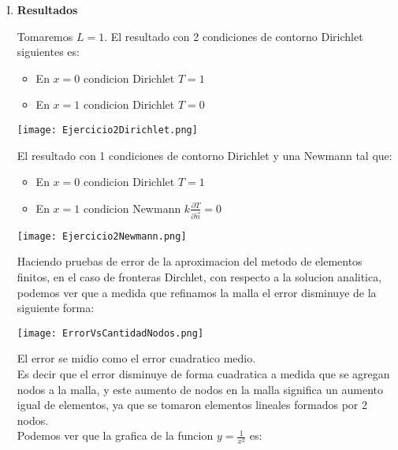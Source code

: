 \documentclass{article}
\begin{document}
\begin{enumerate}[1)]
{\begin{enumerate}[I.]
        Donde $h$ es el ancho de cada elemento.
        Con derivadas:

        \begin{itemize}
            \item $\frac{\partial N_i}{\partial x} = \frac{-1}{h}$
            \item $\frac{\partial N_j}{\partial x} = \frac{1}{h}$
        \end{itemize}

        \item \textbf{Resultados}

        Tomaremos $L=1$. El resultado con 2 condiciones de contorno Dirichlet siguientes es:

        \begin{itemize}
            \item En $x=0$ condicion Dirichlet $T=1$
            \item En $x=1$ condicion Dirichlet $T=0$
        \end{itemize}

        \begin{center}
            \texttt{[image: Ejercicio2Dirichlet.png]}
        \end{center}

        El resultado con 1 condiciones de contorno Dirichlet y una Newmann tal que:

        \begin{itemize}
            \item En $x=0$ condicion Dirichlet $T=1$
            \item En $x=1$ condicion Newmann   $k\frac{\partial T}{\partial \vec{n}}=0$
        \end{itemize}

        \begin{center}
            \texttt{[image: Ejercicio2Newmann.png]}
        \end{center}

        Haciendo pruebas de error de la aproximacion del metodo de elementos finitos, en el caso de fronteras Dirchlet, con respecto
        a la solucion analitica, podemos ver que a medida que refinamos la malla el error disminuye de la siguiente forma:

        \begin{center}
            \texttt{[image: ErrorVsCantidadNodos.png]}
        \end{center}

        El error se midio como el error cuadratico medio.\\
        Es decir que el error disminuye de forma cuadratica a medida que se agregan nodos a la malla, y este aumento de nodos en la malla
        significa un aumento igual de elementos, ya que se tomaron elementos lineales formados por 2 nodos.\\
        Podemos ver que la grafica de la funcion $y=\frac{1}{x^2}$ es:


\end{enumerate}}
\end{enumerate}
\end{document}
